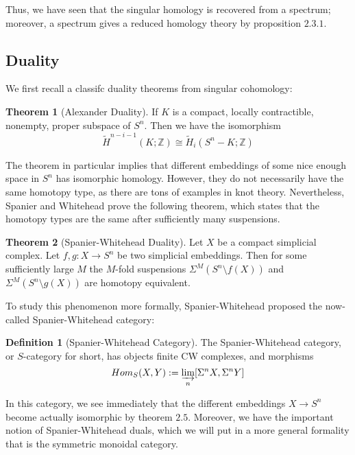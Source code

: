 \documentclass{article}
\theoremstyle{definition}
\newtheorem{theorem}{Theorem}[section]
\theoremstyle{definition}
\newtheorem{definition}{Definition}[theorem]
\theoremstyle{definition}
\theoremstyle{definition}
\theoremstyle{definition}
\theoremstyle{definition}
\theoremstyle{definition}
\begin{document}
Thus, we have seen that the singular homology is recovered from a spectrum; moreover, a spectrum gives a reduced homology theory by proposition $2.3.1$. 

\subsection{Duality}
We first recall a classifc duality theorems from singular cohomology:

\begin{tcolorbox}[colback=red!5!white,colframe=red!30!white]
\begin{theorem}[Alexander Duality]
If $K$ is a compact, locally contractible, nonempty, proper subspace of $S^n$. Then we have the isomorphism
\[\tilde{H}^{n-i-1}(K;\mathbb{Z})\cong \tilde{H}_i(S^n-K;\mathbb{Z})\] 
\end{theorem}
\end{tcolorbox}
The theorem in particular implies that different embeddings of some nice enough space in $S^n$ has isomorphic homology. However, they do not necessarily have the same homotopy type, as there are tons of examples in knot theory. Nevertheless, Spanier and Whitehead prove the following theorem, which states that the homotopy types are the same after sufficiently many suspensions. 

\begin{tcolorbox}[colback=red!5!white,colframe=red!30!white]
\begin{theorem}[Spanier-Whitehead Duality]
    Let $X$ be a compact simplicial complex. Let $f,g: X\to S^n$ be two simplicial embeddings. Then for some sufficiently large $M$ the $M$-fold suspensions $\Sigma^M (S^n\setminus f(X))$ and $\Sigma^M (S^n\setminus g(X))$ are homotopy equivalent.
\end{theorem}
\end{tcolorbox}
To study this phenomenon more formally, Spanier-Whitehead proposed the now-called Spanier-Whitehead category:


\begin{tcolorbox}[colback=purple!5!white,colframe=purple!75!black]
\begin{definition}[Spanier-Whitehead Category]
The Spanier-Whitehead category, or $S$-category for short, has objects finite CW complexes, and morphisms 
\[Hom_{S}(X,Y):=\varinjlim_{n}[\Sigma^n X, \Sigma^n Y]\]
\end{definition}
\end{tcolorbox}
In this category, we see immediately that the different embeddings $X\to S^n$ become actually isomorphic by theorem $2.5$. Moreover, we have the important notion of Spanier-Whitehead duals, which we will put in a more general formality that is the symmetric monoidal category.
\end{document}
